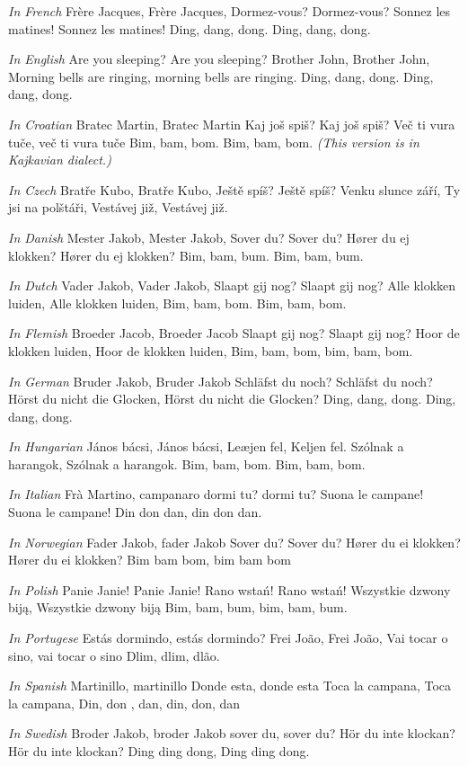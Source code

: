 \beginverse
\textit{In French}
Fr\`ere Jacques, Fr\`ere Jacques,
Dormez-vous? Dormez-vous?
Sonnez les matines! Sonnez les matines!
Ding, dang, dong. Ding, dang, dong.
\endverse

\beginverse
\textit{In English}
Are you sleeping? Are you sleeping?
Brother John, Brother John,
Morning bells are ringing, morning bells are ringing.
Ding, dang, dong. Ding, dang, dong.
\endverse

\beginverse
\textit{In Croatian}
Bratec Martin, Bratec Martin
Kaj jo\v{s} spi\v{s}? Kaj jo\v{s} spi\v{s}?
Ve\v{c} ti vura tu\v{c}e, ve\v{c} ti vura tu\v{c}e
Bim, bam, bom. Bim, bam, bom.
\textit{(This version is in Kajkavian dialect.)}
\endverse

\beginverse
\textit{In Czech}
Brat\v{r}e Kubo, Brat\v{r}e Kubo,
Je\v{s}t\v{e} sp\'i\v{s}? Je\v{s}t\v{e} sp\'i\v{s}?
Venku slunce z\'a\v{r}\'i, Ty jsi na pol\v{s}t\'a\v{r}i,
Vest\'avej ji\v{z}, Vest\'avej ji\v{z}.
\endverse

\beginverse
\textit{In Danish}
Mester Jakob, Mester Jakob,
Sover du? Sover du?
Hører du ej klokken? Hører du ej klokken?
Bim, bam, bum. Bim, bam, bum.
\endverse

\beginverse
\textit{In Dutch}
Vader Jakob, Vader Jakob,
Slaapt gij nog? Slaapt gij nog?
Alle klokken luiden, Alle klokken luiden,
Bim, bam, bom. Bim, bam, bom.
\endverse

\beginverse
\textit{In Flemish}
Broeder Jacob, Broeder Jacob
Slaapt gij nog? Slaapt gij nog?
Hoor de klokken luiden, Hoor de klokken luiden,
Bim, bam, bom, bim, bam, bom.
\endverse

\beginverse
\textit{In German}
Bruder Jakob, Bruder Jakob
Schläfst du noch? Schläfst du noch?
Hörst du nicht die Glocken, Hörst du nicht die Glocken?
Ding, dang, dong. Ding, dang, dong.
\endverse

\beginverse
\textit{In Hungarian}
János bácsi, János bácsi,
Leæjen fel, Keljen fel.
Szólnak a harangok, Szólnak a harangok.
Bim, bam, bom. Bim, bam, bom.
\endverse

\beginverse
\textit{In Italian}
Frà Martino, campanaro
dormi tu? dormi tu?
Suona le campane! Suona le campane!
Din don dan, din don dan.
\endverse

\beginverse
\textit{In Norwegian}
Fader Jakob, fader Jakob
Sover du? Sover du?
Hører du ei klokken? Hører du ei klokken?
Bim bam bom, bim bam bom
\endverse

\beginverse
\textit{In Polish}
Panie Janie! Panie Janie!
Rano wstań! Rano wstań!
Wszystkie dzwony biją, Wszystkie dzwony biją
Bim, bam, bum, bim, bam, bum.
\endverse

\beginverse
\textit{In Portugese}
Estás dormindo, estás dormindo?
Frei João, Frei João,
Vai tocar o sino, vai tocar o sino
Dlim, dlim, dlão.
\endverse

\beginverse
\textit{In Spanish}
Martinillo, martinillo
Donde esta, donde esta
Toca la campana, Toca la campana,
Din, don , dan, din, don, dan
\endverse

\beginverse
\textit{In Swedish}
Broder Jakob, broder Jakob
sover du, sover du?
Hör du inte klockan? Hör du inte klockan?
Ding ding dong, Ding ding dong.
\endverse
\endsong
